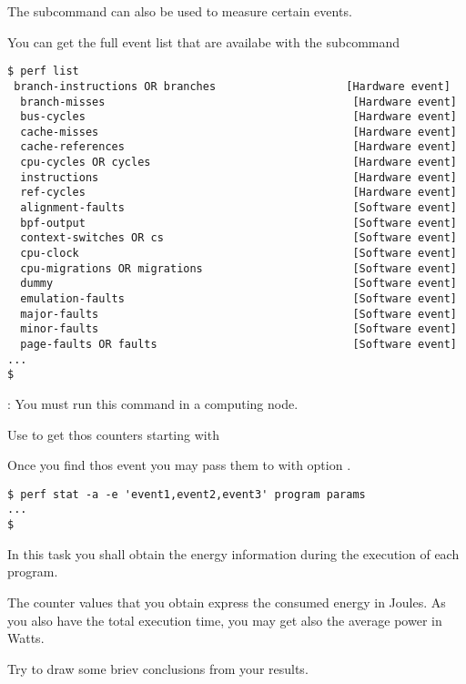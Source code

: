 The  subcommand can also be used to measure certain events.

You can get the full event list that are availabe with the subcommand 

\begin{lstlisting}[style=terminal]
$ perf list
 branch-instructions OR branches                    [Hardware event]
  branch-misses                                      [Hardware event]
  bus-cycles                                         [Hardware event]
  cache-misses                                       [Hardware event]
  cache-references                                   [Hardware event]
  cpu-cycles OR cycles                               [Hardware event]
  instructions                                       [Hardware event]
  ref-cycles                                         [Hardware event]
  alignment-faults                                   [Software event]
  bpf-output                                         [Software event]
  context-switches OR cs                             [Software event]
  cpu-clock                                          [Software event]
  cpu-migrations OR migrations                       [Software event]
  dummy                                              [Software event]
  emulation-faults                                   [Software event]
  major-faults                                       [Software event]
  minor-faults                                       [Software event]
  page-faults OR faults                              [Software event]
...
$
\end{lstlisting}

:
You must run this command in a computing node.

Use  to get thos counters starting with 

Once you find thos event you may pass them to  with
option .

\begin{lstlisting}[style=terminal]
$ perf stat -a -e 'event1,event2,event3' program params
...
$
\end{lstlisting}

In this task you shall obtain the energy information during the execution of each program.

The counter values that you obtain express the consumed energy in Joules.
As you also have the total execution time, you may get also the average power in Watts.

Try to draw some briev conclusions from your results.
